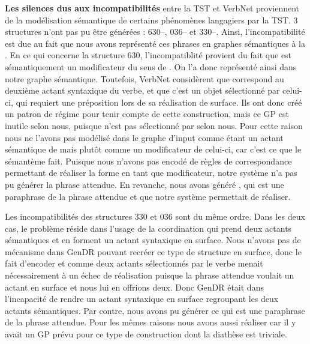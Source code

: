 \textbf{Les silences dus aux incompatibilités} entre la \ac{TST} et VerbNet proviennent de la modélisation sémantique de certains phénomènes langagiers par la \ac{TST}. 3 structures n'ont pas pu être générées : 630--, 036-- et 330--. Ainsi, l'incompatibilité est due au fait que nous avons représenté ces phrases en graphes sémantiques à la \cite{mel2012semantics}. 
En ce qui concerne la structure 630, l'incompatiblité provient du fait que  est sémantiquement un modificateur du sens de . On l'a donc représenté ainsi dans notre graphe sémantique. Toutefois, VerbNet considèrent que  correspond au deuxième actant syntaxique du verbe, et que c'est un objet sélectionné par celui-ci, qui requiert une préposition lors de sa réalisation de surface. Ils ont donc créé un patron de régime pour tenir compte de cette construction, mais ce \ac{GP} est inutile selon nous, puisque  n'est pas sélectionné par  selon nous. Pour cette raison nous ne l'avons pas modélisé dans le graphe d'input comme étant un actant sémantique de  mais plutôt comme un modificateur de celui-ci, car c'est ce que le sémantème  fait. Puisque nous n'avons pas encodé de règles de correspondance permettant de réaliser la forme  en tant que modificateur, notre système n'a pas pu générer la phrase attendue. En revanche, nous avons généré , qui est une paraphrase de la phrase attendue et que notre système permettait de réaliser. 

Les incompatibilités des structures 330 et 036 sont du même ordre. Dans les deux cas, le problème réside dans l'usage de la coordination  qui prend deux actants sémantiques et en forment un actant syntaxique en surface. Nous n'avons pas de mécanisme dans GenDR pouvant recréer ce type de structure en surface, donc le fait d'encoder  et  comme deux actants sélectionnés par le verbe menait nécessairement à un échec de réalisation puisque la phrase attendue voulait un actant en surface et nous lui en offrions deux. Donc GenDR était dans l'incapacité de rendre un actant syntaxique en surface regroupant les deux actants sémantiques. Par contre, nous avons pu générer  ce qui est une paraphrase de la phrase attendue. Pour les mêmes raisons nous avons aussi réaliser  car il y avait un \ac{GP} prévu pour ce type de construction dont la diathèse est triviale.

